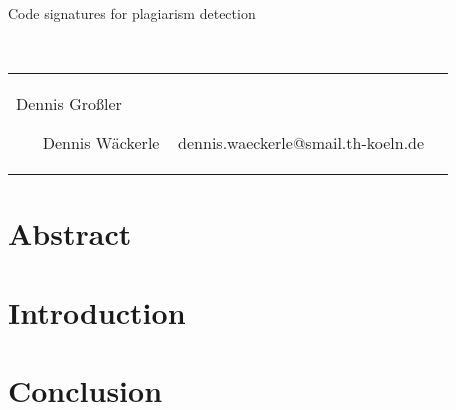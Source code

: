\documentclass[a4paper, 11pt]{article}
\renewcommand{\\}{\vspace*{0.5\baselineskip} \newline}
\begin{document}
\begin{titlepage}

    \begin{huge}
    	Code signatures for plagiarism detection
    \end{huge}
    ~\\
    ~\\
    ~\\
    \noindent\begin{tabular}{ll}
    Dennis Großler

    ~\\
    ~\\
    Dennis Wäckerle
    ~\\
    dennis.waeckerle@smail.th-koeln.de
    \end{tabular}

\end{titlepage}

\section*{Abstract}
\newpage
\tableofcontents
\newpage

\section{Introduction}

\section{Conclusion}

\printbibliography[
	heading=bibintoc,
	title={References}
]

\appendix
\end{document}
